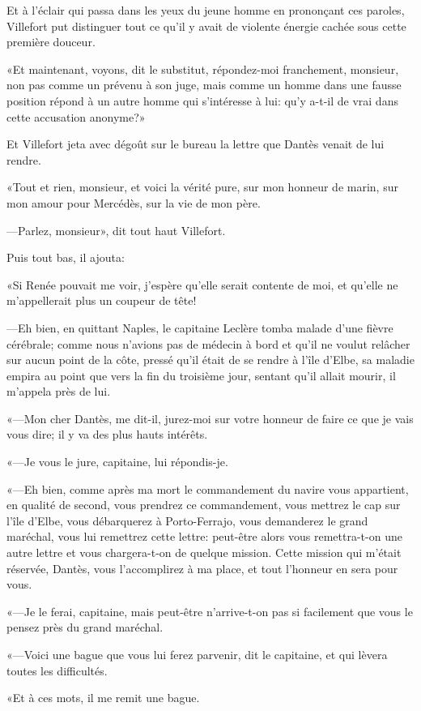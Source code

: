 Et à l'éclair qui passa dans les yeux du jeune homme en prononçant ces paroles, Villefort put distinguer tout ce qu'il y avait de violente énergie cachée sous cette première douceur.

«Et maintenant, voyons, dit le substitut, répondez-moi franchement, monsieur, non pas comme un prévenu à son juge, mais comme un homme dans une fausse position répond à un autre homme qui s'intéresse à lui: qu'y a-t-il de vrai dans cette accusation anonyme?»

Et Villefort jeta avec dégoût sur le bureau la lettre que Dantès venait de lui rendre.

«Tout et rien, monsieur, et voici la vérité pure, sur mon honneur de marin, sur mon amour pour Mercédès, sur la vie de mon père.

—Parlez, monsieur», dit tout haut Villefort.

Puis tout bas, il ajouta:

«Si Renée pouvait me voir, j'espère qu'elle serait contente de moi, et qu'elle ne m'appellerait plus un coupeur de tête!

—Eh bien, en quittant Naples, le capitaine Leclère tomba malade d'une fièvre cérébrale; comme nous n'avions pas de médecin à bord et qu'il ne voulut relâcher sur aucun point de la côte, pressé qu'il était de se rendre à l'île d'Elbe, sa maladie empira au point que vers la fin du troisième jour, sentant qu'il allait mourir, il m'appela près de lui.

«—Mon cher Dantès, me dit-il, jurez-moi sur votre honneur de faire ce que je vais vous dire; il y va des plus hauts intérêts.

«—Je vous le jure, capitaine, lui répondis-je.

«—Eh bien, comme après ma mort le commandement du navire vous appartient, en qualité de second, vous prendrez ce commandement, vous mettrez le cap sur l'île d'Elbe, vous débarquerez à Porto-Ferrajo, vous demanderez le grand maréchal, vous lui remettrez cette lettre: peut-être alors vous remettra-t-on une autre lettre et vous chargera-t-on de quelque mission. Cette mission qui m'était réservée, Dantès, vous l'accomplirez à ma place, et tout l'honneur en sera pour vous.

«—Je le ferai, capitaine, mais peut-être n'arrive-t-on pas si facilement que vous le pensez près du grand maréchal.

«—Voici une bague que vous lui ferez parvenir, dit le capitaine, et qui lèvera toutes les difficultés.

«Et à ces mots, il me remit une bague.

